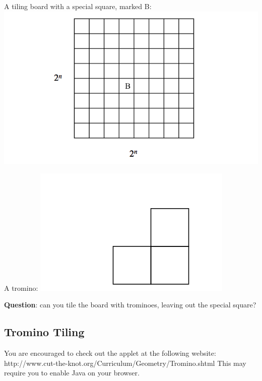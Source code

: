 \documentclass[11pt]{article}
\makeatletter
\def\maxwidth{\ifdim\Gin@nat@width>\linewidth\linewidth
     \else\Gin@nat@width\fi}
\let\Oldincludegraphics\includegraphics
\renewcommand{\includegraphics}[1]{\Oldincludegraphics[width=.8\maxwidth]{#1}}
\makeatother
\begin{document}
 A tiling board with a special square, marked B:
 \includegraphics{images/L13/tilingb.png}
 
     A tromino: \includegraphics{images/L13/tromino.png}
 
     \textbf{Question}: can you tile the board with trominoes, leaving out
 the special square?
 
     \subsection{Tromino Tiling}\label{tromino-tiling}
 
 You are encouraged to check out the applet at the following website:
 http://www.cut-the-knot.org/Curriculum/Geometry/Tromino.shtml This may
 require you to enable Java on your browser.
 
 
     
     
     
     
\end{document}
